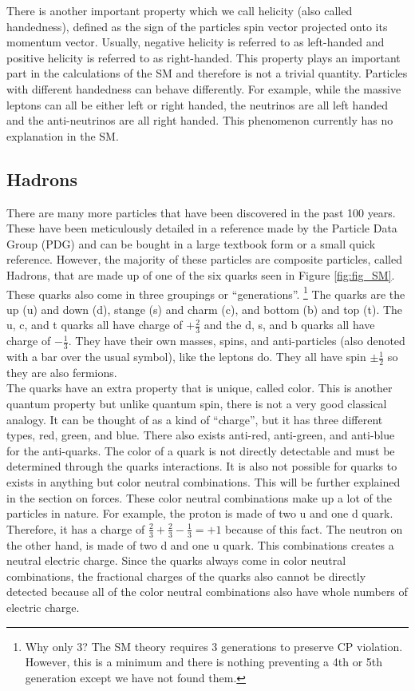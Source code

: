 There is another important property which we call helicity (also called handedness), defined as the sign of the particles spin vector projected onto its momentum vector.
Usually, negative helicity is referred to as left-handed and positive helicity is referred to as right-handed. This property plays an important part in the calculations of the SM and therefore is not a trivial quantity.
Particles with different handedness can behave differently. For example, while the massive leptons can all be either left or right handed, the neutrinos are all left handed and the anti-neutrinos are all right handed.
This phenomenon currently has no explanation in the SM.

\subsection{Hadrons}
There are many more particles that have been discovered in the past 100 years. These have been meticulously detailed in a reference made by the Particle Data Group (PDG) and can be bought in a large textbook form or a small quick reference. 
However, the majority of these particles are composite particles, called Hadrons, that are made up of one of the six quarks seen in Figure \ref{fig:fig_SM}.
These quarks also come in three groupings or ``generations''. \footnote{Why only 3? The SM theory requires 3 generations to preserve CP violation. However, this is a minimum and there is nothing preventing a 4th or 5th generation except we have not found them.}
The quarks are the up (u) and down (d), stange (s) and charm (c), and bottom (b) and top (t). The u, c, and t quarks all have charge of $+ \frac{2}{3}$ and the d, s, and b quarks all have charge of $-\frac{1}{3}$.
They have their own masses, spins, and anti-particles (also denoted with a bar over the usual symbol), like the leptons do. They all have spin $\pm \frac{1}{2}$ so they are also fermions.\\

The quarks have an extra property that is unique, called color. This is another quantum property but unlike quantum spin, there is not a very good classical analogy.
It can be thought of as a kind of ``charge'', but it has three different types, red, green, and blue. There also exists anti-red, anti-green, and anti-blue for the anti-quarks.
The color of a quark is not directly detectable and must be determined through the quarks interactions. 
It is also not possible for quarks to exists in anything but color neutral combinations. This will be further explained in the section on forces.
These color neutral combinations make up a lot of the particles in nature. For example, the proton is made of two u and one d quark. Therefore, it has a charge of $\frac{2}{3} + \frac{2}{3} - \frac{1}{3} = +1$ because of this fact.
The neutron on the other hand, is made of two d and one u quark. This combinations creates a neutral electric charge. 
Since the quarks always come in color neutral combinations, the fractional charges of the quarks also cannot be directly detected because all of the color neutral combinations also have whole numbers of electric charge.

